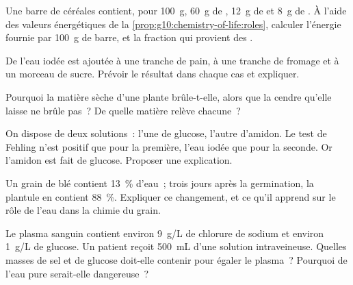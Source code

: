 \begin{exercise}[$\star\star$]\label{exo:g10:chemistry-of-life:8}
Une barre de céréales contient, pour \qty{100}{g}, \qty{60}{g} de
, \qty{12}{g} de  et \qty{8}{g} de . À l'aide
des valeurs énergétiques de la
\cref{prop:g10:chemistry-of-life:roles}, calculer l'énergie fournie par
\qty{100}{g} de barre, et la fraction qui provient des .
\end{exercise}

\begin{exercise}[$\star\star$]\label{exo:g10:chemistry-of-life:9}
De l'eau iodée est ajoutée à une tranche de pain, à une tranche de
fromage et à un morceau de sucre. Prévoir le résultat dans chaque cas
et expliquer.
\end{exercise}

\begin{exercise}[$\star\star$]\label{exo:g10:chemistry-of-life:10}
Pourquoi la matière sèche d'une plante brûle-t-elle, alors que la
cendre qu'elle laisse ne brûle pas~? De quelle matière relève chacune~?
\end{exercise}

\begin{exercise}[$\star\star$]\label{exo:g10:chemistry-of-life:11}
On dispose de deux solutions~: l'une de glucose, l'autre d'amidon. Le
test de Fehling n'est positif que pour la première, l'eau iodée que
pour la seconde. Or l'amidon est fait de glucose. Proposer une
explication.
\end{exercise}

\begin{exercise}[$\star\star\star$]\label{exo:g10:chemistry-of-life:12}
Un grain de blé contient 13~\% d'eau~; trois jours après la
germination, la plantule en contient 88~\%. Expliquer ce changement, et
ce qu'il apprend sur le rôle de l'eau dans la chimie du grain.
\end{exercise}

\begin{exercise}[$\star\star\star$]\label{exo:g10:chemistry-of-life:13}
Le plasma sanguin contient environ \qty{9}{g/L} de chlorure de sodium
et environ \qty{1}{g/L} de glucose. Un patient reçoit \qty{500}{mL}
d'une solution intraveineuse. Quelles masses de sel et de glucose
doit-elle contenir pour égaler le plasma~? Pourquoi de l'eau pure
serait-elle dangereuse~?
\end{exercise}

